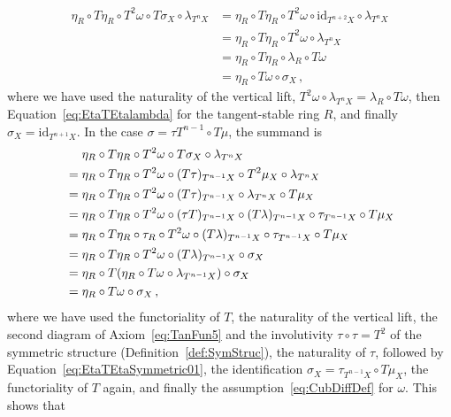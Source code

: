 \documentclass[12pt,reqno, a4paper]{amsart}
\numberwithin{equation}{section}
\theoremstyle{plain}
\theoremstyle{definition}
\theoremstyle{remark}
\newcommand{\id}{\mathrm{id}}
\newcommand{\Val}{\eta}
\begin{document}
\begin{equation*}
\begin{split}
  \Val_R \circ T\Val_R \circ T^2 \omega \circ T\sigma_X
  \circ \lambda_{T^n X}
  &=
  \Val_R \circ T\Val_R \circ T^2 \omega \circ \id_{T^{n+2}X}
  \circ \lambda_{T^n X}
  \\
  &=
  \Val_R \circ T\Val_R \circ T^2 \omega \circ \lambda_{T^n X}
  \\
  &=
  \Val_R \circ T\Val_R \circ \lambda_R \circ T\omega
  \\
  &=
  \Val_R \circ T\omega \circ \sigma_X
  \,,
\end{split}
\end{equation*}
where we have used the naturality of the vertical lift, $T^2\omega \circ \lambda_{T^n X} = \lambda_R \circ T\omega$, then Equation~\eqref{eq:EtaTEtalambda} for the tangent-stable ring $R$, and finally $\sigma_X = \id_{T^{n+1}X}$. In the case $\sigma = \tau T^{n-1} \circ T\mu$, the summand is
\begin{equation*}
\begin{split}
  &\hphantom{{}={}} 
  \Val_R \circ T\Val_R \circ T^2 \omega \circ T\sigma_X
  \circ \lambda_{T^n X}
  \\
  &=
  \Val_R \circ T\Val_R \circ T^2 \omega \circ (T\tau)_{T^{n-1}X} \circ T^2 \mu_X \circ \lambda_{T^n X}
  \\
  &=
  \Val_R \circ T\Val_R \circ T^2 \omega \circ (T\tau)_{T^{n-1}X} \circ \lambda_{T^n X} \circ T\mu_X 
  \\
  &=
  \Val_R \circ T\Val_R \circ T^2 \omega \circ 
  (\tau T)_{T^{n-1}X} \circ (T\lambda)_{T^{n-1} X} \circ
  \tau_{T^{n-1} X} \circ T\mu_X 
  \\
  &=
  \Val_R \circ T\Val_R \circ \tau_R \circ 
  T^2 \omega \circ 
  (T\lambda)_{T^{n-1} X} \circ \tau_{T^{n-1} X} \circ T\mu_X 
  \\
  &=
  \Val_R \circ 
  T\Val_R \circ T^2 \omega \circ (T\lambda)_{T^{n-1} X} 
  \circ \sigma_X 
  \\
  &=
  \Val_R \circ 
  T(\Val_R \circ T\omega \circ \lambda_{T^{n-1} X}) 
  \circ \sigma_X 
  \\
  &=
  \Val_R \circ T\omega \circ \sigma_X
  \,,
\end{split}
\end{equation*}
where we have used the functoriality of $T$, the naturality of the vertical lift, the second diagram of Axiom~\eqref{eq:TanFun5} and the involutivity $\tau \circ \tau = T^2$ of the symmetric structure (Definition~\ref{def:SymStruc}), the naturality of $\tau$, followed by Equation~\eqref{eq:EtaTEtaSymmetric01}, the identification $\sigma_X = \tau_{T^{n-1}X} \circ T\mu_X$, the functoriality of $T$ again, and finally the assumption~\eqref{eq:CubDiffDef} for $\omega$. This shows that 
\end{document}
